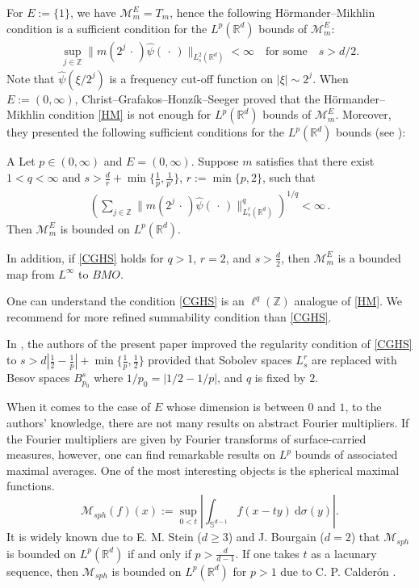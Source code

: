 \documentclass[11pt]{amsart}
\theoremstyle{plain}
\theoremstyle{definition}
\theoremstyle{remark}
\numberwithin{equation}{section}
\newcommand{\cM}{\mathcal{M}}
\newcommand{\bR}{\mathbb{R}}
\newcommand{\bZ}{\mathbb{Z}}
\begin{document}
For $E:=\{1\}$, we have $\mathcal{M}_m^E = T_m$, hence the following H\"ormander--Mikhlin condition is a sufficient condition for the $L^p(\bR^d)$ bounds of $\mathcal{M}_m^E$:
\begin{align}\label{HM}
    \sup_{j\in\bZ} \| m(2^j\,\cdot\,) \widehat{\psi}(\,\cdot\,)\|_{L_s^2(\bR^d)}<\infty\quad\text{for some}\quad  s>d/2.
\end{align}
Note that $\widehat{\psi}(\xi/2^j)$ is a frequency cut-off function on $|\xi|\sim 2^j$.
When $E:=(0, \infty)$, Christ--Grafakos--Honz\'ik--Seeger \cite{Ch_Gr_Hon_See2005} proved that the H\"ormander--Mikhlin condition \eqref{HM} is not enough for $L^p(\bR^d)$ bounds of $\mathcal{M}_m^E$.
Moreover, they presented the following sufficient conditions for the $L^p(\bR^d)$ bounds (see \cite[Theorem 1.2 and (1.12)]{Ch_Gr_Hon_See2005}):
\begin{customthm}{A}\label{thm_CGHS}
Let $p\in(0,\infty)$ and $E=(0,\infty)$. Suppose $m$ satisfies that there exist $1<q<\infty$ and $s>\frac{d}{r}+\min\{\frac{1}{p},\frac{1}{p'}\}$, $r:=\min\{p,2\}$, such that
\begin{align}\label{CGHS}
    \left(\sum_{j\in\bZ} \| m(2^j\,\cdot\,) \widehat{\psi}(\,\cdot\,)\|_{L_s^r(\bR^d)}^q\right)^{1/q} <\infty\,.
\end{align}
Then $\mathcal{M}_m^E$ is bounded on $L^p(\bR^d)$.

In addition, if \eqref{CGHS} holds for $q>1$, $r=2$, and $s>\frac{d}{2}$, then $\cM_m^E$ is a bounded map from $L^{\infty}$ to $BMO$.
\end{customthm}
\noindent One can understand the condition \eqref{CGHS} is an $\ell^q(\bZ)$ analogue of \eqref{HM}.   
We recommend \cite{Ch_Gr_Hon_See2005, Gr_Hon_See2006} for more refined summability condition than \eqref{CGHS}.


In \cite{LeeSeo_2023}, the authors of the present paper improved the regularity condition of \eqref{CGHS} to $s>d\left|\frac{1}{2} - \frac{1}{p}\right| + \min\{\frac{1}{p}, \frac{1}{2}\}$ provided that Sobolev spaces $L_s^r$ are replaced with Besov spaces $B_{p_0}^s$ where $1/p_0 =|1/2- 1/p|$, and $q$ is fixed by $2$.

When it comes to the case of $E$ whose dimension is between $0$ and $1$,
to the authors' knowledge, there are not many results on abstract Fourier multipliers.
If the Fourier multipliers are given by Fourier transforms of surface-carried measures, however, one can find remarkable results on $L^p$ bounds of associated maximal averages. 
One of the most interesting objects is the spherical maximal functions.
$$
    \mathcal{M}_{sph}(f)(x) := \sup_{0<t}\left| \int_{\mathbb{S}^{d-1}} f(x-ty)~\mathrm{d}\sigma(y)\right|.
$$
It is widely known due to E. M. Stein \cite{St1976} ($d\geq3$) and J. Bourgain \cite{Bo1986} ($d=2$) that $\mathcal{M}_{sph}$ is bounded on $L^p(\bR^d)$ if and only if $p>\frac{d}{d-1}$.
If one takes $t$ as a lacunary sequence, then $\mathcal{M}_{sph}$ is bounded on $L^p(\bR^d)$ for $p>1$ due to C. P. Calder\'on \cite{CPCal1979}.
\end{document}
